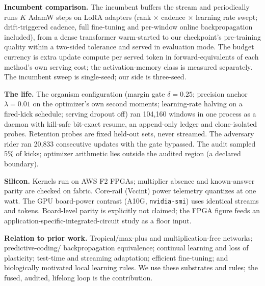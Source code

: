 \documentclass[11pt]{article}
\newcommand{\heading}[1]{\vspace{4pt}\noindent\textbf{#1}\hspace{0.6em}}
\begin{document}
\heading{Incumbent comparison.}
The incumbent buffers the stream and periodically runs $K$ AdamW steps on LoRA
adapters (rank $\times$ cadence $\times$ learning rate swept; drift-triggered
cadence, full fine-tuning and per-window online backpropagation included), from a
dense transformer warm-started to our checkpoint's pre-training quality within a
two-sided tolerance and served in evaluation mode. The budget currency is extra
update compute per served token in forward-equivalents of each method's own
serving cost; the activation-memory class is measured separately. The incumbent
sweep is single-seed; our side is three-seed.

\heading{The life.}
The organism configuration (margin gate $\delta{=}0.25$; precision anchor
$\lambda{=}0.01$ on the optimizer's own second moments; learning-rate halving on
a fired-kick schedule; serving dropout off) ran 104{,}160 windows in one process
as a daemon with kill-safe bit-exact resume, an append-only ledger and
clone-isolated probes. Retention probes are fixed held-out sets, never streamed.
The adversary rider ran 20{,}833 consecutive updates with the gate bypassed. The
audit sampled 5\% of kicks; optimizer arithmetic lies outside the audited region
(a declared boundary).

\heading{Silicon.}
Kernels run on AWS F2 FPGAs; multiplier absence and known-answer parity are
checked on fabric. Core-rail (Vccint) power telemetry quantizes at one watt.
The GPU board-power contrast (A10G, \texttt{nvidia-smi}) uses identical streams
and tokens. Board-level parity is explicitly not claimed; the FPGA figure feeds
an application-specific-integrated-circuit study as a floor input.

\heading{Relation to prior work.}
Tropical/max-plus and multiplication-free networks\cite{zhang2018tropical,
zhu2024matmulfree,tropicalattention2025,morpmamba2024}; predictive-coding/%
backpropagation equivalence\cite{rao1999predictive,millidge2022predictive,
whittington2017approximation,song2020can}; continual learning and loss of
plasticity\cite{kirkpatrick2017overcoming,dohare2024loss}; test-time and
streaming adaptation\cite{sun2020test,elsayed2024streaming}; efficient
fine-tuning\cite{hu2022lora}; and biologically motivated local learning
rules\cite{lillicrap2016random,fremaux2016neuromodulated,bellec2020solution,
payeur2021burst}. We use these substrates and rules; the fused, audited,
lifelong loop is the contribution.
\end{document}
